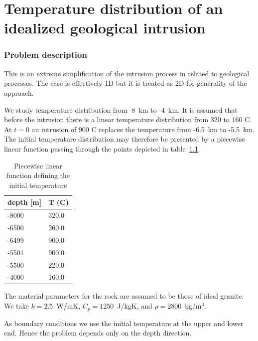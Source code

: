 \chapter{Temperature distribution of an idealized geological intrusion}



\subsection*{Problem description}

This is an extreme simplification of the intrusion process in 
related to geological processes. The case is effectively 1D but 
it is treated as 2D for generality of the approach. 

We study temperature distribution from -8~km to -4~km. It is assumed
that before the intrusion there is a linear temperature distribution
from 320 to 160 C. At $t=0$ an intrusion of 900 C replaces the 
temperature from -6.5~km to -5.5~km. The initial temperature distribution
may therefore be presented by a piecewise linear function passing through 
the points depicted in table~\ref{tb:inittemp}.

\begin{table}[h]
\caption{Piecewise linear function defining the initial temperature}
\label{tb:inittemp}
\begin{center}
\begin{tabular}{ll} \hline
depth [m] & T (C)    \\ \hline
-8000 & 320.0 \\
-6500 & 260.0 \\
-6499 & 900.0 \\
-5501 & 900.0 \\
-5500 & 220.0 \\
-4000 & 160.0 \\ \hline
\end{tabular}
\end{center}
\end{table}

The material parameters for the rock are assumed to be those of ideal granite. 
We take $k=2.5$~W/mK, $C_p=1250$~J/kgK, and $\rho=2800$~kg/m$^3$. 

As boundary conditions we use the initial temperature at the upper and lower end. Hence the problem depends only on the depth direction.


